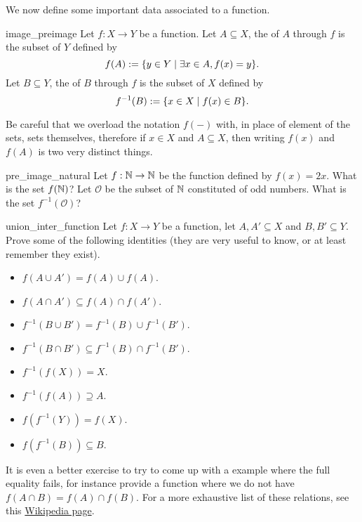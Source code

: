 We now define some important data associated to a function. 
\begin{cdef}{}{image_preimage}
    Let \( f : X \to Y \) be a function. Let \( A \subseteq X \), the  of \( A \) through \( f \) is the subset of \( Y \) defined by
    \begin{equation*}
        f(A) := \{ y \in Y \mid \exists x \in A, f(x) = y \}.
    \end{equation*}
    Let \( B \subseteq Y \), the  of \( B \) through \( f \) is the subset of \( X \) defined by 
    \begin{equation*}
        f^{-1}(B) := \{ x \in X \mid f(x) \in B \}.
    \end{equation*} 
\end{cdef}

Be careful that we overload the notation \( f(-) \) with, in place of element of the sets, sets themselves, therefore if \( x \in X \) and \( A \subseteq X \), then writing \( f(x) \) and \( f(A) \) is two very distinct things.

\begin{cex}{}{pre_image_natural}
    Let \( f : \mathbb{N} \to \mathbb{N} \) be the function defined by \( f(x) = 2x \). What is the set \( f(\mathbb{N}) \)? Let \( \mathcal O \) be the subset of \( \mathbb{N} \) constituted of odd numbers. What is the set \( f^{-1}(\mathcal O) \)?    
\end{cex}

\begin{cex}{}{union_inter_function}
    Let \( f : X \to Y \) be a function, let \( A, A' \subseteq X \) and \( B, B' \subseteq Y \). Prove some of the following identities (they are very useful to know, or at least remember they exist).
    \begin{itemize}
        \item \( f(A \cup A') = f(A) \cup f(A) \).
        \item \( f(A \cap A') \subseteq f(A) \cap f(A') \).
        \item \( f^{-1}(B \cup B') = f^{-1}(B) \cup f^{-1}(B') \).
        \item \( f^{-1}(B \cap B') \subseteq f^{-1}(B) \cap f^{-1}(B') \).
        \item \( f^{-1}(f(X)) = X \).
        \item \( f^{-1}(f(A)) \supseteq A \).
        \item \( f(f^{-1}(Y)) = f(X) \).
        \item \( f(f^{-1}(B)) \subseteq B \).
    \end{itemize}
    It is even a better exercise to try to come up with a example where the full equality fails, for instance provide a function where we do not have \( f(A \cap B) = f(A) \cap f(B) \). For a more exhaustive list of these relations, see this \href{https://en.wikipedia.org/wiki/Image_(mathematics)}{Wikipedia page}.
\end{cex}

